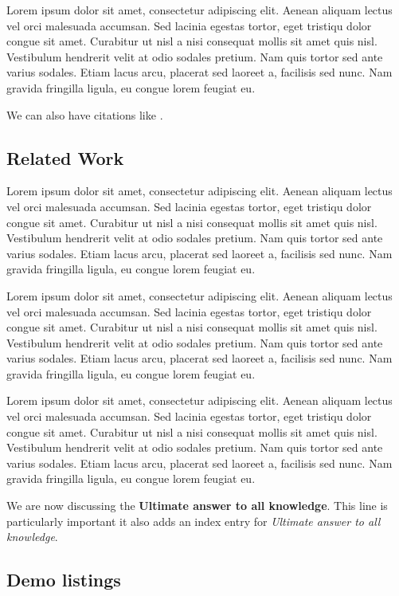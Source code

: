 Lorem ipsum dolor sit amet, consectetur adipiscing elit. Aenean aliquam lectus vel orci malesuada accumsan. Sed lacinia egestas tortor, eget tristiqu dolor congue sit amet. Curabitur ut nisl a nisi consequat mollis sit amet quis nisl. Vestibulum hendrerit velit at odio sodales pretium. Nam quis tortor sed ante varius sodales. Etiam lacus arcu, placerat sed laoreet a, facilisis sed nunc. Nam gravida fringilla ligula, eu congue lorem feugiat eu.

We can also have citations like \cite{iso-odf}.

\subsection{Related Work}

Lorem ipsum dolor sit amet, consectetur adipiscing elit. Aenean aliquam lectus vel orci malesuada accumsan. Sed lacinia egestas tortor, eget tristiqu dolor congue sit amet. Curabitur ut nisl a nisi consequat mollis sit amet quis nisl. Vestibulum hendrerit velit at odio sodales pretium. Nam quis tortor sed ante varius sodales. Etiam lacus arcu, placerat sed laoreet a, facilisis sed nunc. Nam gravida fringilla ligula, eu congue lorem feugiat eu.


Lorem ipsum dolor sit amet, consectetur adipiscing elit. Aenean aliquam lectus vel orci malesuada accumsan. Sed lacinia egestas tortor, eget tristiqu dolor congue sit amet. Curabitur ut nisl a nisi consequat mollis sit amet quis nisl. Vestibulum hendrerit velit at odio sodales pretium. Nam quis tortor sed ante varius sodales. Etiam lacus arcu, placerat sed laoreet a, facilisis sed nunc. Nam gravida fringilla ligula, eu congue lorem feugiat eu.


Lorem ipsum dolor sit amet, consectetur adipiscing elit. Aenean aliquam lectus vel orci malesuada accumsan. Sed lacinia egestas tortor, eget tristiqu dolor congue sit amet. Curabitur ut nisl a nisi consequat mollis sit amet quis nisl. Vestibulum hendrerit velit at odio sodales pretium. Nam quis tortor sed ante varius sodales. Etiam lacus arcu, placerat sed laoreet a, facilisis sed nunc. Nam gravida fringilla ligula, eu congue lorem feugiat eu.

We are now discussing the \textbf{Ultimate answer to all knowledge}.
This line is particularly important it also adds an index entry for \textit{Ultimate answer to all knowledge}.

\subsection{Demo listings}

